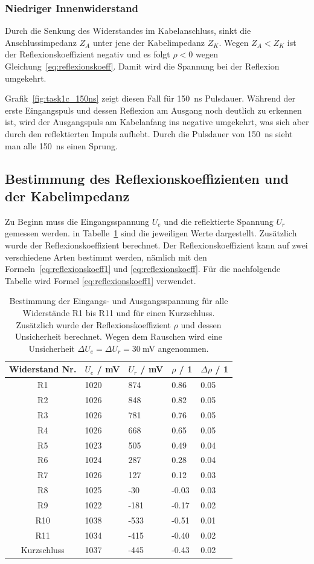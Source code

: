 \documentclass{article}
\begin{document}
\subsubsection{Niedriger Innenwiderstand}

Durch die Senkung des Widerstandes im Kabelanschluss, sinkt die Anschlussimpedanz $Z_A$ unter jene der Kabelimpedanz $Z_K$. Wegen $Z_A < Z_K$ ist der Reflexionskoeffizient negativ und es folgt $\rho < 0$ wegen Gleichung~\eqref{eq:reflexionskoeff}. Damit wird die Spannung bei der Reflexion umgekehrt.

Grafik~\ref{fig:task1c_150ns} zeigt diesen Fall für 150~ns Pulsdauer. Während der erste Eingangspuls und dessen Reflexion am Ausgang noch deutlich zu erkennen ist, wird der Ausgangspuls am Kabelanfang ins negative umgekehrt, was sich aber durch den reflektierten Impuls aufhebt. Durch die Pulsdauer von 150~ns sieht man alle 150~ns einen Sprung.

\subsection{Bestimmung des Reflexionskoeffizienten und der Kabelimpedanz}

Zu Beginn muss die Eingangsspannung $U_e$ und die reflektierte Spannung $U_r$ gemessen werden. in Tabelle~\ref{tab:reflexionskoeff} sind die jeweiligen Werte dargestellt. Zusätzlich wurde der Reflexionskoeffizient berechnet. Der Reflexionskoeffizient kann auf zwei verschiedene Arten bestimmt werden, nämlich mit den Formeln~\eqref{eq:reflexionskoeff1} und \eqref{eq:reflexionskoeff}. Für die nachfolgende Tabelle wird Formel \eqref{eq:reflexionskoeff1} verwendet.

\begin{table}[H]
\centering
\caption{Bestimmung der Eingangs- und Ausgangsspannung für alle Widerstände R1 bis R11 und für einen Kurzschluss. Zusätzlich wurde der Reflexionskoeffizient $\rho$ und dessen Unsicherheit berechnet. Wegen dem Rauschen wird eine Unsicherheit $\Delta U_e = \Delta U_r = 30~$mV angenommen.}
\label{tab:reflexionskoeff}
\begin{tabular}{c|llll}
Widerstand Nr. & $U_e$ / mV & $U_r$ / mV & $\rho$ / 1 & $\Delta \rho$ / 1 \\
\hline
R1 & 1020 & 874 & 0.86 & 0.05 \\
R2 & 1026 & 848 & 0.82 & 0.05 \\
R3 & 1026 & 781 & 0.76 & 0.05 \\
R4 & 1026 & 668 & 0.65 & 0.05 \\
R5 & 1023 & 505 & 0.49 & 0.04 \\
R6 & 1024 & 287 & 0.28 & 0.04 \\
R7 & 1026 & 127 & 0.12 & 0.03 \\
R8 & 1025 & -30 & -0.03 & 0.03 \\
R9 & 1022 & -181 & -0.17 & 0.02 \\
R10 & 1038 & -533 & -0.51 & 0.01\\
R11 & 1034 & -415 & -0.40 & 0.02 \\
Kurzschluss & 1037 & -445 & -0.43 & 0.02
\end{tabular}
\end{table}
\end{document}
